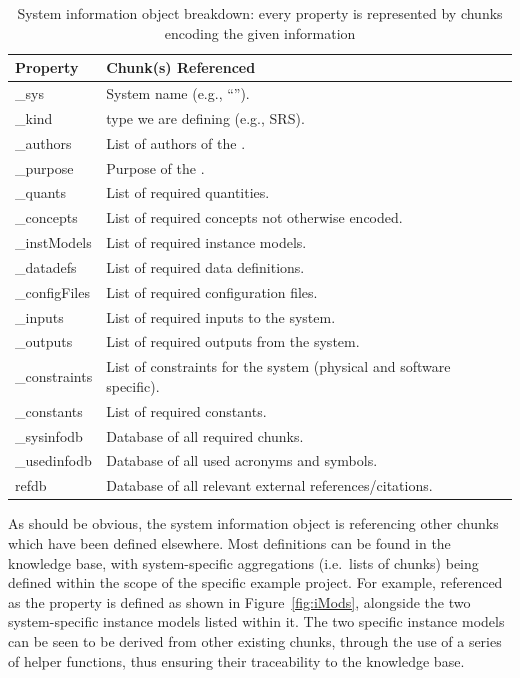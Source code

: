 \begin{table}[]
\caption{System information object breakdown: every property is represented by
chunks encoding the given information}
\label{tab:siBreakdown}
\begin{tabular}{| P{.2\linewidth} | p{.74\linewidth}|}
\hline
 \textbf{Property} & \textbf{Chunk(s) Referenced}
\\ \hline
	\_sys & System name (e.g., ``\gb{}'').
\\ \hline
	\_kind & \SF{} type we are defining (e.g., SRS).
\\ \hline
	\_authors & List of authors of the \sf{}.
\\ \hline
	\_purpose & Purpose of the \sf{}.
\\ \hline
	\_quants & List of required quantities.
\\ \hline
	\_concepts & List of required concepts not otherwise encoded.
\\ \hline
	\_instModels & List of required instance models.
\\ \hline
	\_datadefs & List of required data definitions.
\\ \hline
	\_configFiles & List of required configuration files.
\\ \hline
	\_inputs & List of required inputs to the system.
\\ \hline
	\_outputs & List of required outputs from the system.
\\ \hline
	\_constraints & List of constraints for the system (physical and software 
	specific).
\\ \hline
	\_constants & List of required constants. 
\\ \hline
	\_sysinfodb & Database of all required chunks.
\\ \hline
	\_usedinfodb & Database of all used acronyms and symbols.
\\ \hline
	refdb & Database of all relevant external references/citations.
\\ \hline
\end{tabular}
\end{table}
 
As should be obvious, the system information object is referencing other chunks 
which have been defined elsewhere. Most definitions can be found in the 
knowledge base, with system-specific aggregations (i.e.\ lists of chunks) being
defined within the scope of the specific example project. For example, 
 referenced as the  property is defined 
as shown in Figure~\ref{fig:iMods}, alongside the two system-specific instance 
models listed within it. The two specific instance models can be seen to be 
derived from other existing chunks, through the use of a series of helper 
functions, thus ensuring their traceability to the knowledge base.

